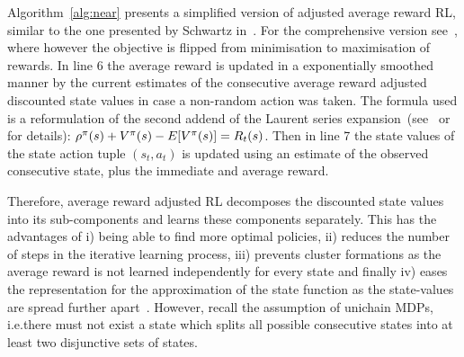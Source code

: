 \documentclass[envcountsame]{llncs}
\begin{document}
Algorithm~\ref{alg:near} presents a simplified version of adjusted average reward RL, similar to the
one presented by Schwartz in~\cite{schwartz1993reinforcement}. For the comprehensive version
see~\cite{schneckenreither2020average}, where however the objective is flipped from minimisation to
maximisation of rewards. In line 6 the average reward is updated in a exponentially smoothed manner
by the current estimates of the consecutive average reward adjusted discounted state values in case
a non-random action was taken. The formula used is a reformulation of the second addend of the
Laurent series expansion~(see~\cite{MillerVeinott1969} or~\cite[p.346]{Puterman94} for details):
\(\rho^{\pi}(s) + V^{\pi}(s) - E[V^{\pi}(s)] = R_{t}(s)\). Then in line 7 the state values of
the state action tuple \((s_{t}, a_{t})\) is updated using an estimate of the observed consecutive
state, plus the immediate and average reward.

Therefore, average reward adjusted RL decomposes the discounted state values into its sub-components
and learns these components separately. This has the advantages of i) being able to find more
optimal policies, ii) reduces the number of steps in the iterative learning process, iii) prevents
cluster formations as the average reward is not learned independently for every state and finally
iv) eases the representation for the approximation of the state function as the state-values are
spread further apart~\cite{schneckenreither2020average}. However, recall the assumption of unichain
MDPs, i.e.\@ there must not exist a state which splits all possible consecutive states into at least
two disjunctive sets of states.
\end{document}
